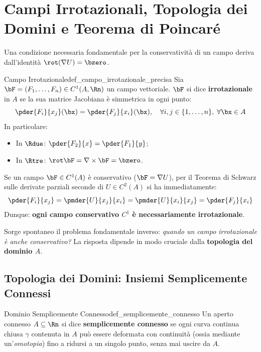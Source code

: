 \section{Campi Irrotazionali, Topologia dei Domini e Teorema di \texorpdfstring{Poincaré}{Poincare}}
\label{sec:poincare_campi}

Una condizione necessaria fondamentale per la conservatività di un campo deriva dall'identità $\rot(\nabla U) = \bzero$.

\begin{definizione}{Campo Irrotazionale}{def_campo_irrotazionale_precisa}
Sia $\bF = (F_1, \dots, F_n) \in C^1(A, \Rn)$ un campo vettoriale. $\bF$ si dice \textbf{irrotazionale} in $A$ se la sua matrice Jacobiana è simmetrica in ogni punto:
\[
\pder{F_i}{x_j}(\bx) = \pder{F_j}{x_i}(\bx), \quad \forall i, j \in \{1, \dots, n\}, \; \forall \bx \in A
\]
In particolare:
\begin{itemize}
    \item In $\Rdue$: $\pder{F_2}{x} = \pder{F_1}{y}$;
    \item In $\Rtre$: $\rot \bF = \nabla \times \bF = \bzero$.
\end{itemize}
\end{definizione}

Se un campo $\bF \in C^1(A)$ è conservativo ($\bF = \nabla U$), per il Teorema di Schwarz sulle derivate parziali seconde di $U \in C^2(A)$ si ha immediatamente:
\[
\pder{F_i}{x_j} = \pmder{U}{x_j}{x_i} = \pmder{U}{x_i}{x_j} = \pder{F_j}{x_i}
\]
Dunque: \textbf{ogni campo conservativo $C^1$ è necessariamente irrotazionale}.

Sorge spontaneo il problema fondamentale inverso: \emph{quando un campo irrotazionale è anche conservativo?} La risposta dipende in modo cruciale dalla \textbf{topologia del dominio $A$}.

\subsection{Topologia dei Domini: Insiemi Semplicemente Connessi}

\begin{definizione}{Dominio Semplicemente Connesso}{def_semplicemente_connesso}
Un aperto connesso $A \subseteq \Rn$ si dice \textbf{semplicemente connesso} se ogni curva continua chiusa $\gamma$ contenuta in $A$ può essere deformata con continuità (ossia mediante un'\emph{omotopia}) fino a ridursi a un singolo punto, senza mai uscire da $A$.
\end{definizione}

